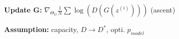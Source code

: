 \textbf{Update G:} $\nabla_{\Theta_G} \frac{1}{N}\sum \log(D(G(z^{(i)})))$ (ascent)\\

\textbf{Assumption:} capacity, $D \rightarrow D^*$, opti. $p_{model}$\\

